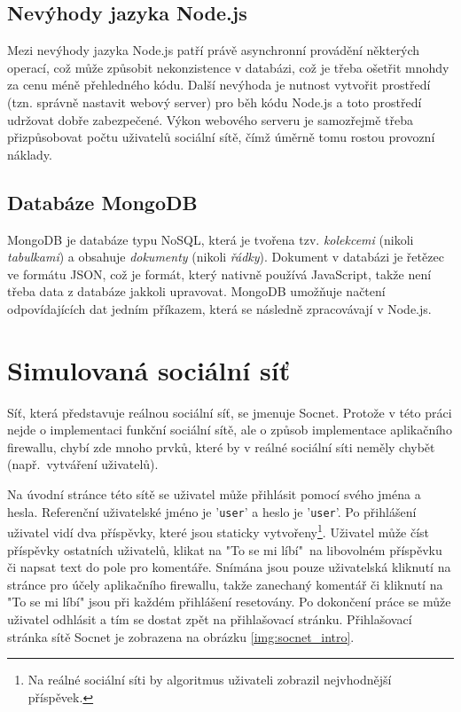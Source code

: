 \subsection*{Nevýhody jazyka Node.js}
Mezi nevýhody jazyka Node.js patří právě asynchronní provádění některých operací, což může způsobit nekonzistence v databázi, což je třeba ošetřit mnohdy za cenu méně přehledného kódu. Další nevýhoda je nutnost vytvořit prostředí (tzn. správně nastavit webový server) pro běh kódu Node.js a toto prostředí udržovat dobře zabezpečené. Výkon webového serveru je samozřejmě třeba přizpůsobovat počtu uživatelů sociální sítě, čímž úměrně tomu rostou provozní náklady.

\subsection*{Databáze MongoDB}
MongoDB je databáze typu NoSQL, která je tvořena tzv. \textit{kolekcemi} (nikoli \textit{tabulkami}) a obsahuje \textit{dokumenty} (nikoli \textit{řádky}). Dokument v databázi je řetězec ve formátu JSON, což je formát, který nativně používá JavaScript, takže není třeba data z databáze jakkoli upravovat. MongoDB umožňuje načtení odpovídajících dat jedním příkazem, která se následně zpracovávají v Node.js.

\section{Simulovaná sociální síť}
Síť, která představuje reálnou sociální síť, se jmenuje Socnet. Protože v této práci nejde o implementaci funkční sociální sítě, ale o způsob implementace aplikačního firewallu, chybí zde mnoho prvků, které by v reálné sociální síti neměly chybět (např.~vytváření uživatelů).

Na úvodní stránce této sítě se uživatel může přihlásit pomocí svého jména a hesla. Referenční uživatelské jméno je '\texttt{user}' a heslo je '\texttt{user}'. Po přihlášení uživatel vidí dva příspěvky, které jsou staticky vytvořeny\footnote{Na reálné sociální síti by algoritmus uživateli zobrazil nejvhodnější příspěvek.}. Uživatel může číst příspěvky ostatních uživatelů, klikat na "To se mi líbí"~na libovolném příspěvku či napsat text do pole pro komentáře. Snímána jsou pouze uživatelská kliknutí na stránce pro účely aplikačního firewallu, takže zanechaný komentář či kliknutí na "To se mi líbí" jsou při každém přihlášení resetovány. Po dokončení práce se může uživatel odhlásit a tím se dostat zpět na přihlašovací stránku. Přihlašovací stránka sítě Socnet je zobrazena na obrázku \ref{img:socnet_intro}.

